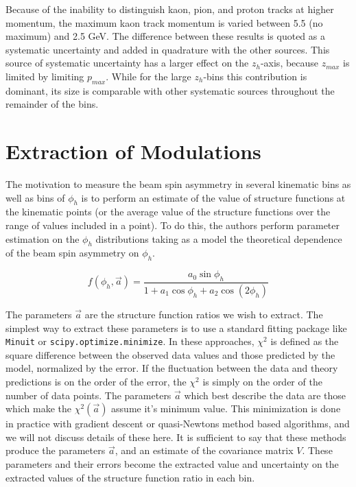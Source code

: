 Because of the inability to distinguish kaon, pion, and proton tracks at higher momentum, the maximum kaon track momentum is varied between 5.5 (no maximum) and 2.5 GeV.  The difference between these results is quoted as a systematic uncertainty and added in quadrature with the other sources.  This source of systematic uncertainty has a larger effect on the $z_h$-axis, because $z_{max}$ is limited by limiting $p_{max}$.  While for the large $z_h$-bins this contribution is dominant, its size is comparable with other systematic sources throughout the remainder of the bins.

\section{Extraction of Modulations}
The motivation to measure the beam spin asymmetry in several kinematic bins as well as bins of $\phi_{h}$ is to perform an estimate of the value of structure functions at the kinematic points (or the average value of the structure functions over the range of values included in a point).  To do this, the authors perform parameter estimation on the $\phi_{h}$ distributions taking as a model the theoretical dependence of the beam spin asymmetry on $\phi_{h}$.

\begin{equation}
  f(\phi_h, \vec{a}) = \frac{a_0 \sin\phi_h}{1 + a_1 \cos\phi_h + a_2 \cos(2\phi_h)}
\end{equation}

The parameters $\vec{a}$ are the structure function ratios we wish to extract.  The simplest way to extract these parameters is to use a standard fitting package like \texttt{Minuit} or \texttt{scipy.optimize.minimize}.  In these approaches, $\chi^2$ is defined as the square difference between the observed data values and those predicted by the model, normalized by the error.  If the fluctuation between the data and theory predictions is on the order of the error, the $\chi^2$ is simply on the order of the number of data points.  The parameters $\vec{a}$ which best describe the data are those which make the $\chi^2 (\vec{a})$ assume it's minimum value.  This minimization is done in practice with gradient descent or quasi-Newtons method based algorithms, and we will not discuss details of these here.  It is sufficient to say that these methods produce the parameters $\vec{a}$, and an estimate of the covariance matrix $V$.  These parameters and their errors become the extracted value and uncertainty on the extracted values of the structure function ratio in each bin. \\

